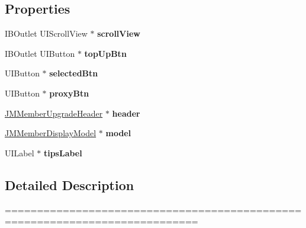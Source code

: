 \subsection*{Properties}
\begin{DoxyCompactItemize}
\item 
\mbox{\label{category_j_m_member_charge_controller_07_08_adc640f79bcee84cd7788821cbe3ec28a}} 
I\+B\+Outlet U\+I\+Scroll\+View $\ast$ {\bfseries scroll\+View}
\item 
\mbox{\label{category_j_m_member_charge_controller_07_08_a8c714402844675db98309807d5840428}} 
I\+B\+Outlet U\+I\+Button $\ast$ {\bfseries top\+Up\+Btn}
\item 
\mbox{\label{category_j_m_member_charge_controller_07_08_ac2e721010a3e4ed388243cb36cf2f93e}} 
U\+I\+Button $\ast$ {\bfseries selected\+Btn}
\item 
\mbox{\label{category_j_m_member_charge_controller_07_08_abe6bc6942ef4034918df4658bdb0ed5e}} 
U\+I\+Button $\ast$ {\bfseries proxy\+Btn}
\item 
\mbox{\label{category_j_m_member_charge_controller_07_08_a13714db600abbb241f066128e892f822}} 
\mbox{\hyperlink{interface_j_m_member_upgrade_header}{J\+M\+Member\+Upgrade\+Header}} $\ast$ {\bfseries header}
\item 
\mbox{\label{category_j_m_member_charge_controller_07_08_adf14772364e541480388acdd4c532768}} 
\mbox{\hyperlink{interface_j_m_member_display_model}{J\+M\+Member\+Display\+Model}} $\ast$ {\bfseries model}
\item 
\mbox{\label{category_j_m_member_charge_controller_07_08_a0b8b2e933598f141c919d1f2e7e986d0}} 
U\+I\+Label $\ast$ {\bfseries tips\+Label}
\end{DoxyCompactItemize}


\subsection{Detailed Description}
============================================================================

